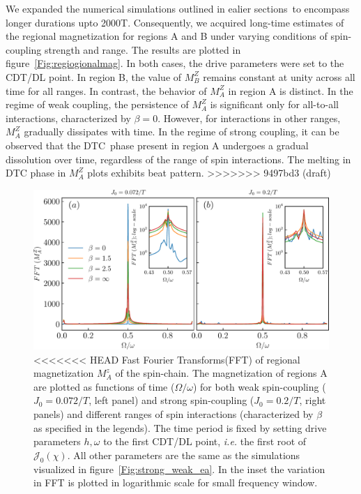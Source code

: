 \documentclass[12pt]{iopart}
\begin{document}
We expanded the numerical simulations outlined in ealier sections to encompass longer durations upto 2000T. Consequently, we acquired long-time estimates of the regional magnetization for regions A and B under varying conditions of spin-coupling strength and range. The results are plotted in figure~\ref{Fig:regiogionalmag}. In both cases, the drive parameters were set to the CDT/DL point. In region B, the value of $M^Z_B$ remains constant at unity across all time for all ranges. In contrast, the behavior of $M^Z_A$ in region A is distinct. In the regime of weak coupling, the persistence of $M^Z_A$ is significant only for all-to-all interactions, characterized by $\beta=0$. However, for interactions in other ranges, $M^Z_A$ gradually dissipates with time. In the regime of strong coupling, it can be observed that the DTC phase present in region A undergoes a gradual dissolution over time, regardless of the range of spin interactions. The melting in DTC phase in $M^Z_A$ plots exhibits beat pattern.
>>>>>>> 9497bd3 (draft)
\begin{figure}[t]
	\centering
	\hspace{1.5cm}\includegraphics[width = 13cm]{figure10.pdf}
	\caption{
<<<<<<< HEAD
		Fast Fourier Transforms(FFT) of regional magnetization $M^z_{A}$ of the spin-chain. The magnetization of regions A are plotted as functions of time ($\Omega/\omega$) for both weak spin-coupling ($J_0=0.072/T$, left panel) and strong spin-coupling ($J_0=0.2/T$, right panels) and different ranges of spin interactions (characterized by $\beta$ as specified in the legends). The time period is fixed by setting drive parameters $h,\omega$ to the first CDT/DL point, \textit{i.e.} the first root of $\mathcal{J}_0(\chi)$. All other parameters are the same as the simulations visualized in figure~\ref{Fig:strong_weak_ea}. In the inset the variation in FFT is plotted in logarithmic scale for small frequency window.}
	\label{Fig:regionalFFT}
\end{figure}
\end{document}
